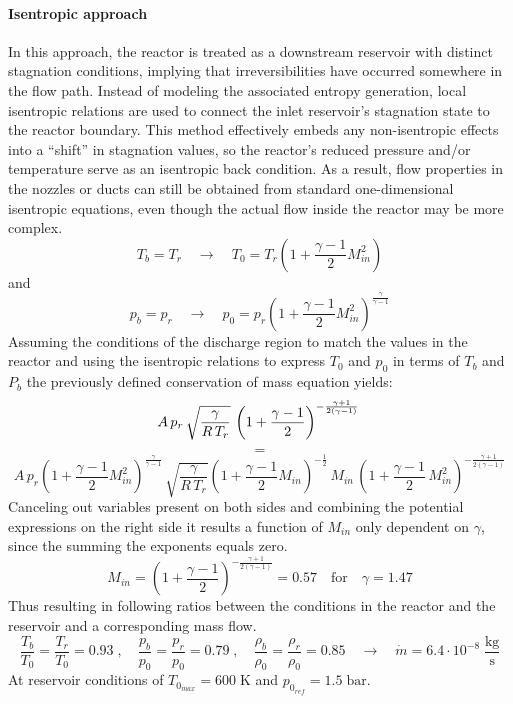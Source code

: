 \paragraph{Isentropic approach}
	In this approach, the reactor is treated as a downstream reservoir with distinct stagnation conditions, implying that irreversibilities have occurred somewhere in the flow path.
	Instead of modeling the associated entropy generation, local isentropic relations are used to connect the inlet reservoir’s stagnation state to the reactor boundary.
	This method effectively embeds any non-isentropic effects into a “shift” in stagnation values, so the reactor’s reduced pressure and/or temperature serve as an isentropic back condition.
	As a result, flow properties in the nozzles or ducts can still be obtained from standard one-dimensional isentropic equations, even though the actual flow inside the reactor may be more complex.
	$$
		T_b = T_r
		\quad \to \quad
		T_0 = T_r \left(1 + \frac{\gamma - 1}{2}M_{in}^2 \right)
	$$
	and
	$$
		p_b = p_r
		\quad \to \quad
		p_0 = p_r \left(1 + \frac{\gamma - 1}{2}M_{in}^2 \right)^{\frac{\gamma}{\gamma - 1}}
	$$
	Assuming the conditions of the discharge region to match the values in the reactor and using the isentropic relations to express $T_0$ and $p_0$ in terms of $T_b$ and $P_b$ the previously defined conservation of mass equation yields:
	$$
		A\, p_r\, \sqrt{\frac{\gamma}{R\,T_r}}\,\left(1+\frac{\gamma-1}{2}\right)^{-\frac{\gamma+1}{2(\gamma-1)}}\\
	$$
	$$
		=
	$$
	$$
		A\, p_r\left(1 + \frac{\gamma - 1}{2}M_{in}^2\right)^{\frac{\gamma}{\gamma-1}}\, \sqrt{\frac{\gamma}{R\,T_r}}\left(1 + \frac{\gamma - 1}{2}M_{in}\right)^{-\frac{1}{2}}\, M_{in}\,\left(1+\frac{\gamma-1}{2}\,M_{in}^2\right)^{-\frac{\gamma+1}{2(\gamma-1)}}
	$$
	Canceling out variables present on both sides and combining the potential expressions on the right side it results a function of $M_{in}$ only dependent on $\gamma$, since the summing the exponents equals zero.
	$$
		M_{in} = \left(1 + \frac{\gamma - 1}{2}\right)^{-\frac{\gamma + 1}{2(\gamma - 1)}}= 0.57
		\quad \text{for} \quad \gamma = 1.47
	$$
	Thus resulting in following ratios between the conditions in the reactor and the reservoir and a corresponding mass flow.
	$$
		\frac{T_b}{T_0} = \frac{T_r}{T_0} = 0.93\;,
			\quad
		\frac{p_b}{p_0} = \frac{p_r}{p_0} = 0.79\;,
			\quad
		\frac{\rho_b}{\rho_0} = \frac{\rho_r}{\rho_0} = 0.85
			\quad \rightarrow \quad
		\dot{m} = 6.4 \cdot 10^{-8}\; \frac{\text{kg}}{\text{s}}
	$$
	At reservoir conditions of $T_{0_{max}} = 600\;\text{K}$ and $p_{0_{ref}} = 1.5\;\text{bar}$.
